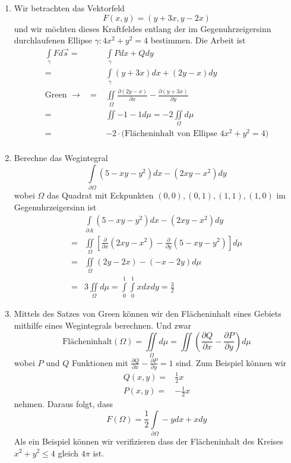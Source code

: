 \begin{enumerate}
\item Wir betrachten das Vektorfeld \[ F\left( x,y\right) = \left( y+3x,y-2x\right) \]
und wir möchten dieses Kraftfeldes entlang der im Gegenuhrzeigersinn durchlaufenen Ellipse $\gamma: 4x^2+y^2=4$ bestimmen. Die Arbeit ist
\begin{align*}
\int\limits_\gamma  {Fd\vec s}  =&\int\limits_\gamma  {Pdx + Qdy} \\
 =&\int\limits_\gamma  {\left( {y + 3x} \right)dx + \left( {2y - x} \right)dy} \\
{\text{Green }} \to {\text{ }} =&\iint\limits_\Omega\frac{{\partial \left( {2y - x} \right)}}{{\partial x}} - \frac{{\partial \left( {y + 3x} \right)}}{{\partial y}}\\
=&\iint -1-1d\mu=-2\iint\limits_\Omega d\mu\\
=&-2\cdot\text{(Flächeninhalt von Ellipse $4x^2+y^2=4$)}\\
\end{align*}
\item Berechne das Wegintegral \[\int\limits_{\partial \Omega } {\left( {5 - xy - {y^2}} \right)dx - \left( {2xy - {x^2}} \right)dy} \] wobei $\Omega$ das Quadrat mit Eckpunkten $(0,0),(0,1),(1,1),(1,0)$ im Gegenuhrzeigersinn ist
\begin{align*}
&\int\limits_{\partial A} {\left( {5 - xy - {y^2}} \right)dx - \left( {2xy - {x^2}} \right)dy} \\
=&\iint\limits_\Omega\left[ {\frac{\partial }{{\partial x}}\left( {2xy - {x^2}} \right) - \frac{\partial }{{\partial y}}\left( {5 - xy - {y^2}} \right)} \right]d\mu \\
=&\iint\limits_\Omega\left(  2y-2x\right) - \left( -x-2y\right) d\mu\\
=&3\iint\limits_\Omega d\mu=\int\limits_0^1\int\limits_0^1 x dx dy=\frac{3}{2}
\end{align*}
\item Mittels des Satzes von Green können wir den Flächeninhalt eines Gebiets mithilfe eines Wegintegrals berechnen. Und zwar
\[ \text{Flächeninhalt$\left( \Omega\right)$}=\iint\limits_\Omega d\mu=\iint\left( \frac{\partial Q}{\partial x}-\frac{\partial P}{\partial y}\right) d\mu\]
wobei $P$ und $Q$ Funktionen mit $\frac{\partial Q}{\partial x}-\frac{\partial P}{\partial y}=1$ sind. Zum Beispiel können wir
\begin{align*}
Q\left( x,y\right)=&\frac{1}{2}x\\
P\left( x,y\right)=&-\frac{1}{2}x
\end{align*}
nehmen. Daraus folgt, dass \[ F\left( \Omega\right) = \frac{1}{2}\int\limits_{\partial\Omega}-y dx+xdy\]
Als ein Beispiel können wir verifizieren dass der Flächeninhalt des Kreises $x^2+y^2\leq 4$ gleich $4\pi$ ist. \\


\end{enumerate}
